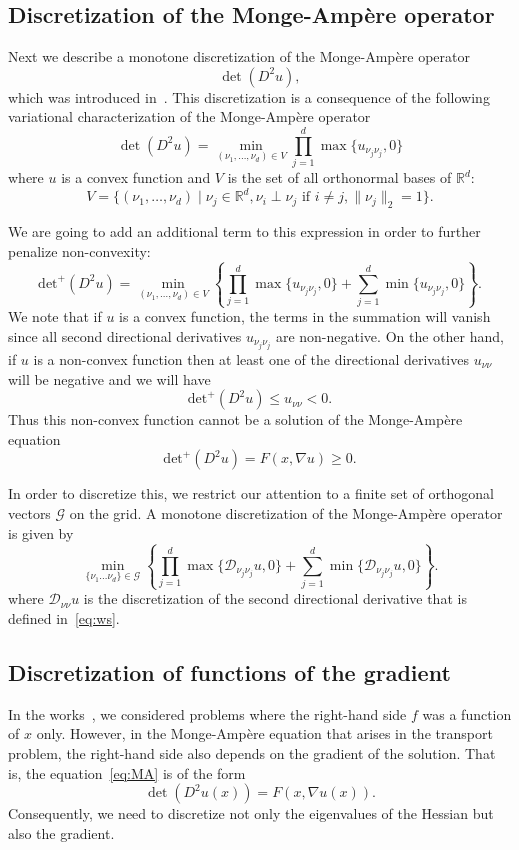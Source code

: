 \documentclass{amsart}
\theoremstyle{lemma}
\theoremstyle{remark}
\begin{document}
\subsection{Discretization of the {{Monge-Amp\`ere}\xspace} operator}\label{sec:discMAop}
Next we describe a monotone discretization of the {{Monge-Amp\`ere}\xspace} operator
\[ \det(D^2u), \]
which was introduced in~\cite{FOTheory}.  This discretization is a consequence of the following variational characterization of the {{Monge-Amp\`ere}\xspace} operator
\[ \det(D^2u) = \min\limits_{(\nu_1,\ldots,\nu_d)\in V} \prod\limits_{j=1}^d \max\{u_{\nu_j\nu_j},0\} \]
where $u$ is a convex function and $V$ is the set of all orthonormal bases of ${\mathbb{R}}^d$:
\[ V = \{(\nu_1,\ldots,\nu_d)  \mid \nu_j\in{\mathbb{R}}^d,\nu_i\perp\nu_j \text{ if }i\neq j, \|\nu_j\|_2 = 1\}. \]

We are going to add an additional term to this expression in order to further penalize non-convexity:
\[ \text{det}^+(D^2u) =  \min\limits_{(\nu_1,\ldots,\nu_d)\in V} \left\{\prod\limits_{j=1}^d \max\{u_{\nu_j\nu_j},0\} + \sum\limits_{j=1}^d \min\{u_{\nu_j\nu_j},0\}\right\}.\]
We note that if $u$ is a convex function, the terms in the summation will vanish since all second directional derivatives $u_{\nu_j\nu_j}$ are non-negative.  On the other hand, if $u$ is a non-convex function then at least one of the directional derivatives $u_{\nu\nu}$ will be negative and we will have
\[  \text{det}^+(D^2u) \leq  u_{\nu\nu} < 0.\]
Thus this non-convex function cannot be a solution of the {{Monge-Amp\`ere}\xspace} equation
\begin{equation}\label{eq:MAconv} \text{det}^+(D^2u) = F(x,\nabla u)\geq0. \end{equation}

In order to discretize this, we restrict our attention to a finite set of orthogonal vectors ${\mathcal{G}}$ on the grid.  A monotone discretization of the {{Monge-Amp\`ere}\xspace} operator is given by
\[
\min\limits_{\{\nu_1\ldots\nu_d\}\in {\mathcal{G}}}
\left\{\prod\limits_{j=1}^{d} \max\{{\mathcal{D}}_{\nu_j\nu_j}u,0\}  + \sum\limits_{j=1}^d \min\{{\mathcal{D}}_{\nu_j\nu_j}u,0\}\right\}.
\]
where ${\mathcal{D}}_{\nu\nu}u$ is the discretization of the second directional derivative that is defined in~\eqref{eq:ws}.

\subsection{Discretization of functions of the gradient}\label{sec:discGrad}
In the works~\cite{FOTheory,FONum}, we considered problems where the right-hand side $f$ was a function of $x$ only.  However, in the {{Monge-Amp\`ere}\xspace} equation that arises in the transport problem, the right-hand side also depends on the gradient of the solution.  That is, the equation~\eqref{eq:MA} is of the form
\begin{equation}\label{eq:gMA} \det(D^2u(x)) = F(x,\nabla u(x)). \end{equation}
Consequently, we need to discretize not only the eigenvalues of the Hessian but also the gradient.
\end{document}
